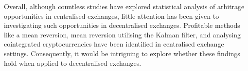 \noindent Overall, although countless studies have explored statistical analysis of arbitrage opportunities in centralised exchanges, little attention has been given to investigating such opportunities in decentralised exchanges. Profitable methods like a mean reversion, mean reversion utilising the Kalman filter, and analysing cointegrated cryptocurrencies have been identified in centralised exchange settings. Consequently, it would be intriguing to explore whether these findings hold when applied to decentralised exchanges.
